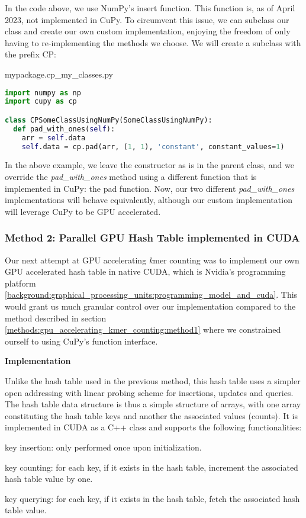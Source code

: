 In the code above, we use NumPy's insert function.
This function is, as of April 2023, not implemented in CuPy.
To circumvent this issue, we can subclass our class and create our own custom implementation, enjoying the freedom of only having to re-implementing the methods we choose.
We will create a subclass with the prefix CP:
\begin{center}
mypackage.cp\_my\_classes.py
\end{center}
\begin{lstlisting}[language=Python,style=pycode]
import numpy as np
import cupy as cp

class CPSomeClassUsingNumPy(SomeClassUsingNumPy):
  def pad_with_ones(self):
    arr = self.data
    self.data = cp.pad(arr, (1, 1), 'constant', constant_values=1)
\end{lstlisting}

In the above example, we leave the constructor as is in the parent class, and we override the \textit{pad\_with\_ones} method using a different function that is implemented in CuPy: the pad function.
Now, our two different \textit{pad\_with\_ones} implementations will behave equivalently, although our custom implementation will leverage CuPy to be GPU accelerated.

\subsubsection{Method 2: Parallel GPU Hash Table implemented in CUDA}
Our next attempt at GPU accelerating \textit{k}mer counting was to implement our own GPU accelerated hash table in native CUDA, which is Nvidia's programming platform \ref{background:graphical_processing_units:programming_model_and_cuda}.
This would grant us much granular control over our implementation compared to the method described in section \ref{methods:gpu_accelerating_kmer_counting:method1} where we constrained ourself to using CuPy's function interface.

\textbf{\large{Implementation}}

Unlike the hash table used in the previous method, this hash table uses a simpler open addressing with linear probing scheme for insertions, updates and queries.
The hash table data structure is thus a simple structure of arrays, with one array constituting the hash table keys and another the associated values (counts).
It is implemented in CUDA as a C++ class and supports the following functionalities:
\begin{compactitem}
  \item key insertion: only performed once upon initialization.
  \item key counting: for each key, if it exists in the hash table, increment the associated hash table value by one.
  \item key querying: for each key, if it exists in the hash table, fetch the associated hash table value.
\end{compactitem}


